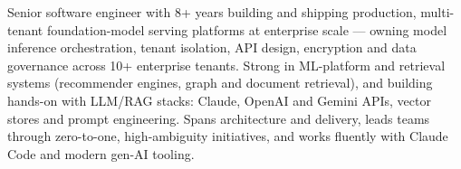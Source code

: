 
\begin{cvparagraph}
Senior software engineer with 8+ years building and shipping production, multi-tenant foundation-model serving platforms at enterprise scale --- owning model inference orchestration, tenant isolation, API design, encryption and data governance across 10+ enterprise tenants. Strong in ML-platform and retrieval systems (recommender engines, graph and document retrieval), and building hands-on with LLM/RAG stacks: Claude, OpenAI and Gemini APIs, vector stores and prompt engineering. Spans architecture and delivery, leads teams through zero-to-one, high-ambiguity initiatives, and works fluently with Claude Code and modern gen-AI tooling.
\end{cvparagraph}
